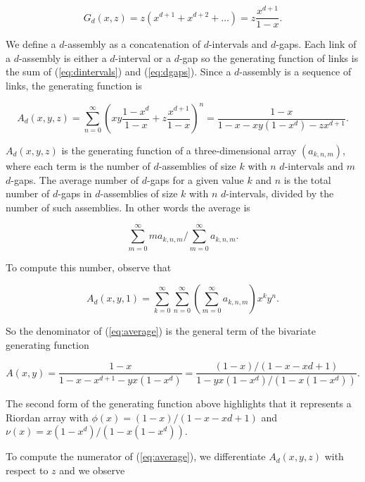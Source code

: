 \documentclass{article}
\begin{document}
\begin{equation}
\label{eq:dgaps}
G_d(x,z) = z(x^{d+1}+x^{d+2}+\ldots) = z\frac{x^{d+1}}{1-x}.
\end{equation}

We define a $d$-assembly as a concatenation of $d$-intervals and $d$-gaps.
Each link of a $d$-assembly is either a $d$-interval or a $d$-gap so the
generating function of links is the sum of (\ref{eq:dintervals}) and
(\ref{eq:dgaps}). Since a $d$-assembly is a sequence of links, the
generating function is

\begin{equation*}
A_d(x,y,z) = \sum_{n=0}^\infty \left(xy\frac{1-x^d}{1-x} +
z\frac{x^{d+1}}{1-x}\right)^n =
\frac{1-x}{1-x-xy(1-x^d) -zx^{d+1}}.
\end{equation*}

$A_d(x,y,z)$ is the generating function of a three-dimensional array
$(a_{k,n,m})$, where each term is the number of $d$-assemblies of size $k$
with $n$ $d$-intervals and $m$ $d$-gaps. The average number of $d$-gaps
for a given value $k$ and $n$ is the total number of $d$-gaps in
$d$-assemblies of size $k$ with $n$ $d$-intervals, divided by the number
of such assemblies. In other words the average is

\begin{equation}
\label{eq:average}
\sum_{m=0}^\infty ma_{k,n,m}\Big/\sum_{m=0}^\infty a_{k,n,m}.
\end{equation}

To compute this number, observe that

\begin{equation*}
A_d(x,y,1) = \sum_{k=0}^\infty\sum_{n=0}^\infty
\left(\sum_{m=0}^\infty a_{k,n,m}\right) x^ky^n.
\end{equation*}

So the denominator of (\ref{eq:average}) is the general term of the
bivariate generating function

\begin{equation*}
A(x,y) = \frac{1-x}{1-x-x^{d+1}-yx(1-x^d) } =
\frac{(1-x)/(1-x-x{d+1})}{1-yx(1-x^d)/(1-x(1-x^d))}.
\end{equation*}

The second form of the generating function above highlights that it
represents a Riordan array with $\phi(x) = (1-x)/(1-x-x{d+1})$ and $\nu(x)
= x(1-x^d)/(1-x(1-x^d))$.

To compute the numerator of (\ref{eq:average}), we differentiate
$A_d(x,y,z)$ with respect to $z$ and we observe
\end{document}
